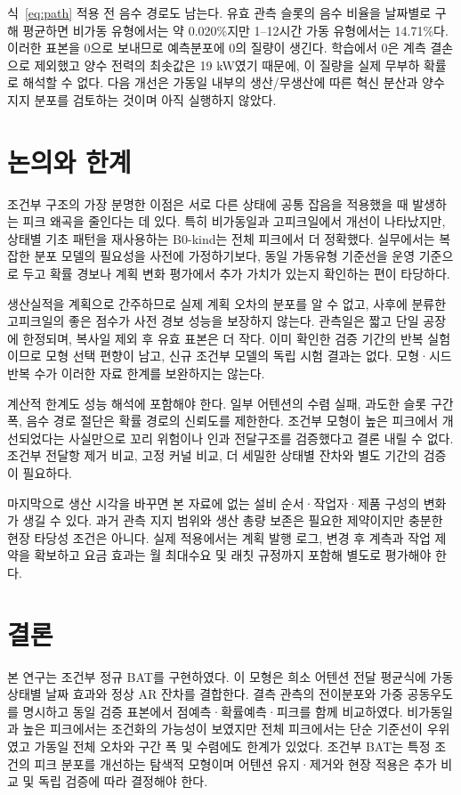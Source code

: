 \documentclass[letterpaper]{article}
\begin{document}
식~\eqref{eq:path} 적용 전 음수 경로도 남는다. 유효 관측 슬롯의 음수 비율을 날짜별로 구해 평균하면 비가동 유형에서는 약 0.020\%지만 1--12시간 가동 유형에서는 14.71\%다. 이러한 표본을 0으로 보내므로 예측분포에 0의 질량이 생긴다. 학습에서 0은 계측 결손으로 제외했고 양수 전력의 최솟값은 19 kW였기 때문에, 이 질량을 실제 무부하 확률로 해석할 수 없다. 다음 개선은 가동일 내부의 생산/무생산에 따른 혁신 분산과 양수 지지 분포를 검토하는 것이며 아직 실행하지 않았다.



\section{논의와 한계}
조건부 구조의 가장 분명한 이점은 서로 다른 상태에 공통 잡음을 적용했을 때 발생하는 피크 왜곡을 줄인다는 데 있다. 특히 비가동일과 고피크일에서 개선이 나타났지만, 상태별 기초 패턴을 재사용하는 B0-kind는 전체 피크에서 더 정확했다. 실무에서는 복잡한 분포 모델의 필요성을 사전에 가정하기보다, 동일 가동유형 기준선을 운영 기준으로 두고 확률 경보나 계획 변화 평가에서 추가 가치가 있는지 확인하는 편이 타당하다.

생산실적을 계획으로 간주하므로 실제 계획 오차의 분포를 알 수 없고, 사후에 분류한 고피크일의 좋은 점수가 사전 경보 성능을 보장하지 않는다. 관측일은 짧고 단일 공장에 한정되며, 복사일 제외 후 유효 표본은 더 작다. 이미 확인한 검증 기간의 반복 실험이므로 모형 선택 편향이 남고, 신규 조건부 모델의 독립 시험 결과는 없다. 모형·시드 반복 수가 이러한 자료 한계를 보완하지는 않는다.

계산적 한계도 성능 해석에 포함해야 한다. 일부 어텐션의 수렴 실패, 과도한 슬롯 구간 폭, 음수 경로 절단은 확률 경로의 신뢰도를 제한한다. 조건부 모형이 높은 피크에서 개선되었다는 사실만으로 꼬리 위험이나 인과 전달구조를 검증했다고 결론 내릴 수 없다. 조건부 전달항 제거 비교, 고정 커널 비교, 더 세밀한 상태별 잔차와 별도 기간의 검증이 필요하다.

마지막으로 생산 시각을 바꾸면 본 자료에 없는 설비 순서·작업자·제품 구성의 변화가 생길 수 있다. 과거 관측 지지 범위와 생산 총량 보존은 필요한 제약이지만 충분한 현장 타당성 조건은 아니다. 실제 적용에서는 계획 발행 로그, 변경 후 계측과 작업 제약을 확보하고 요금 효과는 월 최대수요 및 래칫 규정까지 포함해 별도로 평가해야 한다.

\section{결론}
본 연구는 조건부 정규 BAT를 구현하였다. 이 모형은 희소 어텐션 전달 평균식에 가동 상태별 날짜 효과와 정상 AR 잔차를 결합한다. 결측 관측의 전이분포와 가중 공동우도를 명시하고 동일 검증 표본에서 점예측·확률예측·피크를 함께 비교하였다. 비가동일과 높은 피크에서는 조건화의 가능성이 보였지만 전체 피크에서는 단순 기준선이 우위였고 가동일 전체 오차와 구간 폭 및 수렴에도 한계가 있었다. 조건부 BAT는 특정 조건의 피크 분포를 개선하는 탐색적 모형이며 어텐션 유지·제거와 현장 적용은 추가 비교 및 독립 검증에 따라 결정해야 한다.
\end{document}
